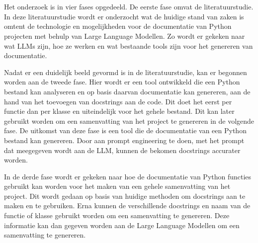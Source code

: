 
\chapter{}%
\label{ch:methodologie}



Het onderzoek is in vier fases opgedeeld. De eerste fase omvat de literatuurstudie.
In deze literatuurstudie wordt er onderzocht wat de huidige stand van zaken is omtent de technologie en mogelijkheden voor de documentatie van Python projecten met behulp van Large Language Modellen.
Zo wordt er gekeken naar wat LLMs zijn, hoe ze werken en wat bestaande tools zijn voor het genereren van documentatie.

Nadat er een duidelijk beeld gevormd is in de literatuurstudie, kan er begonnen worden aan de tweede fase.
Hier wordt er een tool ontwikkeld die een Python bestand kan analyseren en op basis daarvan documentatie kan genereren, aan de hand van het toevoegen van docstrings aan de code.
Dit doet het eerst per functie dan per klasse en uiteindelijk voor het gehele bestand. Dit kan later gebruikt worden om een samenvatting van het project te genereren in de volgende fase.
De uitkomst van deze fase is een tool die de documentatie van een Python bestand kan genereren. 
Door aan prompt engineering te doen, met het prompt dat meegegeven wordt aan de LLM, kunnen de bekomen docstrings accurater worden. %

In de derde fase wordt er gekeken naar hoe de documentatie van Python functies gebruikt kan worden voor het maken van een gehele samenvatting van het project.
Dit wordt gedaan op basis van huidige methoden om docstrings aan te maken en te gebruiken. Erna kunnen de verschillende docstrings en naam van de functie of klasse gebruikt worden om een samenvatting te genereren.
Deze informatie kan dan gegeven worden aan de Large Language Modellen om een samenvatting te genereren.


